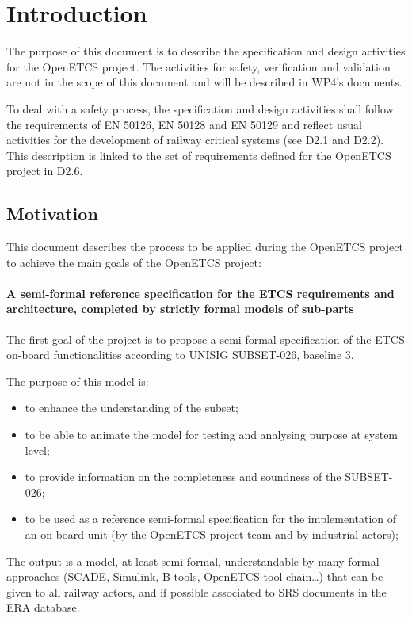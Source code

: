 
\section{Introduction}

The purpose of this document is to describe the specification and design activities for the OpenETCS project. The activities for safety, verification and validation are not in the scope of this document and will be described in WP4's documents.

To deal with a safety process, the specification and design activities shall follow the requirements of EN 50126, EN 50128 and EN 50129 and reflect usual activities for the development of railway critical systems (see D2.1  and D2.2).
This description is linked to the set of requirements defined for the OpenETCS project in D2.6.

\subsection{Motivation}

This document describes the process to  be applied  during the OpenETCS project to achieve the main goals of the OpenETCS project:

\paragraph{A semi-formal reference specification for the ETCS requirements and architecture, completed by strictly formal  models of sub-parts}
The first goal of the project is to propose a semi-formal specification of the ETCS on-board functionalities according to  UNISIG SUBSET-026, baseline 3.

The purpose of this model is:
\begin{itemize}
\item to enhance the understanding of the subset;
\item to be able to animate the model for testing and analysing purpose at system level;
\item to provide information on the completeness and soundness of the SUBSET-026;
\item to be used as a reference semi-formal specification for the implementation of an on-board unit
(by the OpenETCS project team and by industrial actors);
\end{itemize}

The output is a model, at least semi-formal, understandable by many formal approaches (SCADE,
Simulink, B tools, OpenETCS tool chain…) that can be given to all railway actors, and
if possible associated to SRS documents in the ERA database.

